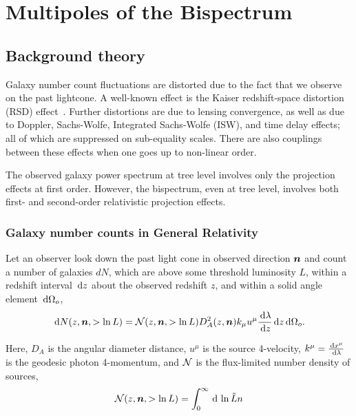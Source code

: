 \chapter{Multipoles of the Bispectrum}
\label{chapter:multipoles}



\section{Background theory}

Galaxy number count fluctuations are distorted due to the fact that we observe on the past lightcone. A well-known effect is the Kaiser redshift-space distortion (RSD) effect~\citep{Verde:1998zr,Scoccimarro:1999ed}. Further distortions are due to lensing convergence, as well as due to Doppler, Sachs-Wolfe, Integrated Sachs-Wolfe (ISW), and time delay effects; all of which are suppressed on sub-equality scales. There are also couplings between these effects when one goes up to non-linear order. 

The observed galaxy power spectrum at tree level involves only the projection effects at first order. However, the bispectrum, even at tree level, involves both first- and second-order relativistic projection effects. 


\subsection{Galaxy number counts in General Relativity}

Let an observer look down the past light cone in observed direction $\bm {n}$ and count a number of galaxies $dN$, which are above some threshold luminosity $L$, within a redshift interval $\,\mathrm{d} z$ about the observed redshift $z$, and within a solid angle element $\,\mathrm{d} \Omega_o$, 
\begin{equation}	
	\,\mathrm{d} N(z, \bm {n}, > \ln L) = \mathcal{N}(z, \bm {n}, >\ln L) D_A^2(z,\bm {n}) k_\mu u^\mu \frac{\,\mathrm{d} \lambda}{\,\mathrm{d} z} \,\mathrm{d} z \,\mathrm{d} \Omega_o.
\end{equation}	

Here, $D_A$ is the angular diameter distance, $u^\mu$ is the source 4-velocity, $k^\mu = \frac{\,\mathrm{d} x^\mu}{\,\mathrm{d} \lambda}$ is the geodesic photon 4-momentum, and $\mathcal{N}$ is the flux-limited number density of sources,
\begin{equation}
	\mathcal{N}(z,\bm {n},>\ln L) = \int_0^\infty \,\mathrm{d}\,\ln \tilde{L} n
\end{equation}


